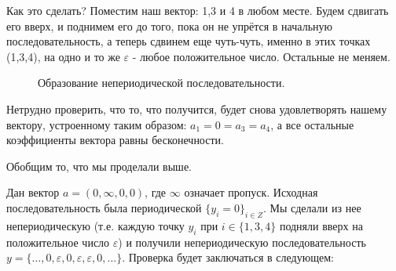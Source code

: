 \documentclass[russian]{lecture-notes}
\begin{document}
Как это сделать? Поместим наш вектор: 1,3 и 4 в любом месте. Будем сдвигать его вверх, и поднимем его до того, пока он не упрётся в начальную последовательность, а теперь сдвинем еще чуть-чуть, именно в этих точках (1,3,4), на одно и то же $\varepsilon$ - любое положительное число. Остальные не меняем.

\begin{figure}[h!]
\caption{Образование непериодической последовательности.} 
\end{figure}

Нетрудно проверить, что то, что получится, будет снова удовлетворять нашему вектору, устроенному таким образом: $a_1=0=a_3=a_4$,
а все остальные коэффициенты вектора равны бесконечности.


Обобщим то, что мы проделали выше.

Дан вектор $a = (0,\infty,0,0)$, где $\infty$ означает пропуск.
Исходная последовательность была периодической $\{y_i=0\} _{i\in Z}$. Мы сделали из нее непериодическую (т.е. каждую точку  $y_i$ при $i\in\{1,3,4\}$ подняли вверх на положительное число $\varepsilon$) и получили непериодическую последовательность $y=\{\ldots,0,\varepsilon,0,\varepsilon,\varepsilon,0,\ldots\}$. Проверка будет заключаться в следующем:
\end{document}
